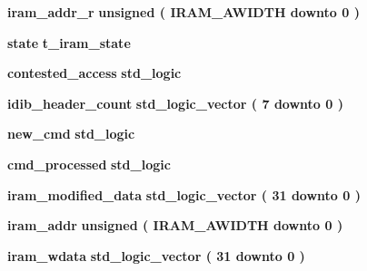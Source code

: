 \begin{DoxyCompactItemize}
\item 
{\bf iram\+\_\+addr\+\_\+r} {\bfseries \textcolor{comment}{unsigned}\textcolor{vhdlchar}{ }\textcolor{vhdlchar}{(}\textcolor{vhdlchar}{ }\textcolor{vhdlchar}{ }\textcolor{vhdlchar}{ }\textcolor{vhdlchar}{ }{\bfseries {\bf I\+R\+A\+M\+\_\+\+A\+W\+I\+D\+TH}} \textcolor{vhdlchar}{ }\textcolor{keywordflow}{downto}\textcolor{vhdlchar}{ }\textcolor{vhdlchar}{ } \textcolor{vhdldigit}{0} \textcolor{vhdlchar}{ }\textcolor{vhdlchar}{)}\textcolor{vhdlchar}{ }} 
\item 
{\bf state} {\bfseries {\bfseries {\bf t\+\_\+iram\+\_\+state}} \textcolor{vhdlchar}{ }} 
\item 
{\bf contested\+\_\+access} {\bfseries \textcolor{comment}{std\+\_\+logic}\textcolor{vhdlchar}{ }} 
\item 
{\bf idib\+\_\+header\+\_\+count} {\bfseries \textcolor{comment}{std\+\_\+logic\+\_\+vector}\textcolor{vhdlchar}{ }\textcolor{vhdlchar}{(}\textcolor{vhdlchar}{ }\textcolor{vhdlchar}{ } \textcolor{vhdldigit}{7} \textcolor{vhdlchar}{ }\textcolor{keywordflow}{downto}\textcolor{vhdlchar}{ }\textcolor{vhdlchar}{ } \textcolor{vhdldigit}{0} \textcolor{vhdlchar}{ }\textcolor{vhdlchar}{)}\textcolor{vhdlchar}{ }} 
\item 
{\bf new\+\_\+cmd} {\bfseries \textcolor{comment}{std\+\_\+logic}\textcolor{vhdlchar}{ }} 
\item 
{\bf cmd\+\_\+processed} {\bfseries \textcolor{comment}{std\+\_\+logic}\textcolor{vhdlchar}{ }} 
\item 
{\bf iram\+\_\+modified\+\_\+data} {\bfseries \textcolor{comment}{std\+\_\+logic\+\_\+vector}\textcolor{vhdlchar}{ }\textcolor{vhdlchar}{(}\textcolor{vhdlchar}{ }\textcolor{vhdlchar}{ } \textcolor{vhdldigit}{31} \textcolor{vhdlchar}{ }\textcolor{keywordflow}{downto}\textcolor{vhdlchar}{ }\textcolor{vhdlchar}{ } \textcolor{vhdldigit}{0} \textcolor{vhdlchar}{ }\textcolor{vhdlchar}{)}\textcolor{vhdlchar}{ }} 
\item 
{\bf iram\+\_\+addr} {\bfseries \textcolor{comment}{unsigned}\textcolor{vhdlchar}{ }\textcolor{vhdlchar}{(}\textcolor{vhdlchar}{ }\textcolor{vhdlchar}{ }\textcolor{vhdlchar}{ }\textcolor{vhdlchar}{ }{\bfseries {\bf I\+R\+A\+M\+\_\+\+A\+W\+I\+D\+TH}} \textcolor{vhdlchar}{ }\textcolor{keywordflow}{downto}\textcolor{vhdlchar}{ }\textcolor{vhdlchar}{ } \textcolor{vhdldigit}{0} \textcolor{vhdlchar}{ }\textcolor{vhdlchar}{)}\textcolor{vhdlchar}{ }} 
\item 
{\bf iram\+\_\+wdata} {\bfseries \textcolor{comment}{std\+\_\+logic\+\_\+vector}\textcolor{vhdlchar}{ }\textcolor{vhdlchar}{(}\textcolor{vhdlchar}{ }\textcolor{vhdlchar}{ } \textcolor{vhdldigit}{31} \textcolor{vhdlchar}{ }\textcolor{keywordflow}{downto}\textcolor{vhdlchar}{ }\textcolor{vhdlchar}{ } \textcolor{vhdldigit}{0} \textcolor{vhdlchar}{ }\textcolor{vhdlchar}{)}\textcolor{vhdlchar}{ }} 

\end{DoxyCompactItemize}
